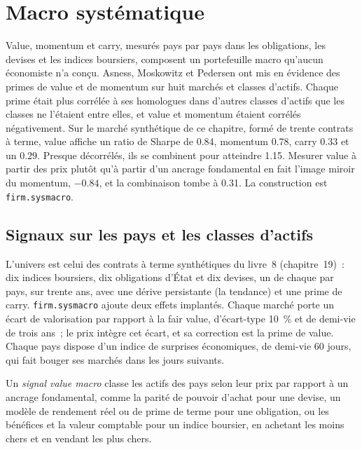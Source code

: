 \chapter{Macro systématique}\label{ch:s2:systematic-macro}

Value, momentum et carry, mesurés pays par pays dans les obligations, les devises et les indices boursiers, composent un portefeuille macro qu'aucun économiste n'a conçu.
Asness, Moskowitz et Pedersen ont mis en évidence des primes de value et de momentum sur huit marchés et classes d'actifs. Chaque prime était plus corrélée à ses homologues dans d'autres
classes d'actifs que les classes ne l'étaient entre elles, et value et momentum étaient corrélés négativement. Sur le marché synthétique de ce chapitre, formé de
trente contrats à terme, value affiche un ratio de Sharpe de 0.84, momentum 0.78, carry 0.33 et un  0.29. Presque décorrélés, ils se combinent
pour atteindre 1.15. Mesurer value à partir des prix plutôt qu'à partir d'un ancrage fondamental en fait l'image miroir du momentum, $-0.84$, et la combinaison tombe à
0.31. La construction est \texttt{firm.sysmacro}.

\section{Signaux sur les pays et les classes d'actifs}

L'univers est celui des contrats à terme synthétiques du livre~8 (chapitre~19)~: dix indices boursiers, dix obligations d'État et dix devises, un de chaque par pays, sur
trente ans, avec une dérive persistante (la tendance) et une prime de carry. \texttt{firm.sysmacro} ajoute deux effets implantés. Chaque marché porte un
écart de valorisation par rapport à la fair value, d'écart-type 10~\% et de demi-vie de trois ans~; le prix intègre cet écart, et sa correction est la
prime de value. Chaque pays dispose d'un indice de surprises économiques, de demi-vie 60 jours, qui fait bouger ses marchés dans les jours suivants.

\begin{definition}\label{def:s2:systematic-macro:value}
Un \emph{signal value macro} classe les actifs des pays selon leur prix par rapport à un ancrage fondamental, comme la parité de
pouvoir d'achat pour une devise, un modèle de rendement réel ou de prime de terme pour une obligation, ou les bénéfices et la valeur comptable pour un indice boursier, en achetant les moins chers et en vendant les
plus chers.
\end{definition}

